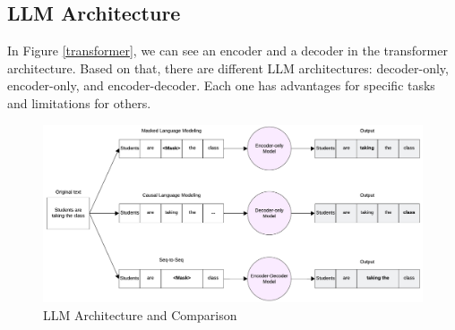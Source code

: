\subsection{LLM Architecture}
In Figure \ref{transformer}, we can see an encoder and a decoder in the transformer architecture. Based on that, there are different LLM architectures: decoder-only, encoder-only, and encoder-decoder. Each one has advantages for specific tasks and limitations for others.


\begin{figure}[!hb]
    \centering
        \includegraphics[width=1\linewidth]{images/LLM_Arch_text_generation.png}
        \caption{LLM Architecture and Comparison}
        \label{text_generation}
\end{figure}


